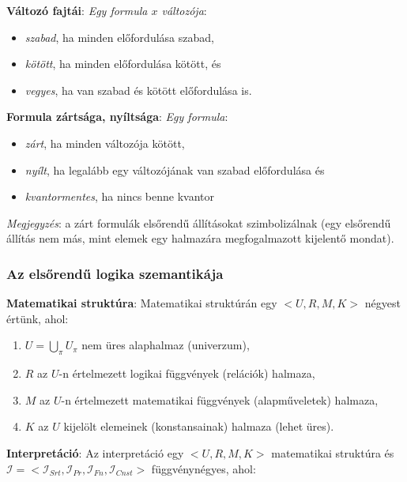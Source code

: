 \documentclass[tikz,12pt,margin=0px]{article}
\begin{document}
	\noindent \textbf{Változó fajtái}: \emph{Egy formula $x$ változója}:
	
	\begin{itemize}
		\item	\emph{szabad}, ha minden előfordulása szabad,
		\item	\emph{kötött}, ha minden előfordulása kötött, és
		\item	\emph{vegyes}, ha van szabad és kötött előfordulása is.
	\end{itemize}
	
	\noindent \textbf{Formula zártsága, nyíltsága}: \emph{Egy formula}:
	
	\begin{itemize}
		\item	\emph{zárt}, ha minden változója kötött,
		\item	\emph{nyílt}, ha legalább egy változójának van szabad előfordulása és
		\item	\emph{kvantormentes}, ha nincs benne kvantor
	\end{itemize}
	
	\noindent \emph{Megjegyzés}: a zárt formulák elsőrendű állításokat szimbolizálnak (egy elsőrendű állítás nem más, mint elemek egy halmazára megfogalmazott kijelentő mondat).
	
	\subsubsection*{Az elsőrendű logika szemantikája}
	
	\noindent \textbf{Matematikai struktúra}: Matematikai struktúrán egy $\Big<U, R, M, K\Big>$ négyest értünk, ahol:
	
	\begin{enumerate}
		\item	$U = \bigcup\limits_{\pi} U_{\pi}$ nem üres alaphalmaz (univerzum),
		
		\item	$R$ az $U$-n értelmezett logikai függvények (relációk) halmaza,
		
		\item	$M$ az $U$-n értelmezett matematikai függvények (alapműveletek) halmaza,
		
		\item	$K$ az $U$ kijelölt elemeinek (konstansainak) halmaza (lehet üres).
	\end{enumerate}
	
	\noindent \textbf{Interpretáció}: Az interpretáció egy $\Big<U, R, M, K\Big>$ matematikai struktúra és\\
	$\mathcal{I} = \Big<\mathcal{I}_{Srt}, \mathcal{I}_{Pr}, \mathcal{I}_{Fn}, \mathcal{I}_{Cnst}\Big>$
	függvénynégyes, ahol:
	
\end{document}

